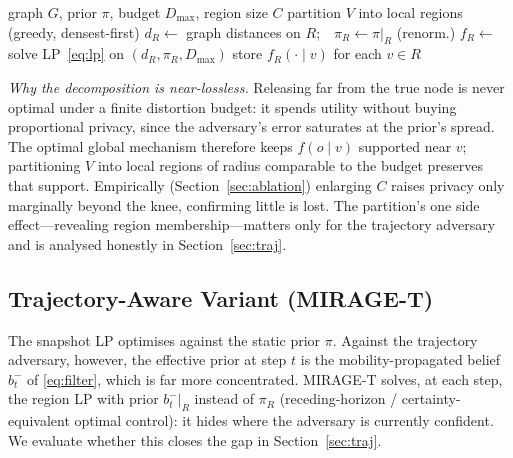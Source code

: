 \documentclass[10pt,journal,compsoc]{IEEEtran}
\begin{document}
\begin{algorithm}[t]
\caption{MIRAGE precompute (per graph, offline)}
\label{alg:mirage}
\begin{algorithmic}[1]
\REQUIRE graph $G$, prior $\pi$, budget $D_{\max}$, region size $C$
\STATE partition $V$ into local regions (greedy, densest-first)
  \STATE $d_R\leftarrow$ graph distances on $R$;\ \ $\pi_R\leftarrow\pi|_R$ (renorm.)
  \STATE $f_R\leftarrow$ solve LP~\eqref{eq:lp} on $(d_R,\pi_R,D_{\max})$
  \STATE store $f_R(\cdot\mid v)$ for each $v\in R$
\ENDFOR
\end{algorithmic}
\end{algorithm}

\emph{Why the decomposition is near-lossless.} Releasing far from the true node is
never optimal under a finite distortion budget: it spends utility without buying
proportional privacy, since the adversary's error saturates at the prior's spread.
The optimal global mechanism therefore keeps $f(o\mid v)$ supported near $v$;
partitioning $V$ into local regions of radius comparable to the budget preserves
that support. Empirically (Section~\ref{sec:ablation}) enlarging $C$ raises privacy
only marginally beyond the knee, confirming little is lost. The partition's one
side effect---revealing region membership---matters only for the trajectory
adversary and is analysed honestly in Section~\ref{sec:traj}.

\subsection{Trajectory-Aware Variant (MIRAGE-T)}
The snapshot LP optimises against the static prior $\pi$. Against the trajectory
adversary, however, the effective prior at step $t$ is the mobility-propagated
belief $b_t^-$ of \eqref{eq:filter}, which is far more concentrated. MIRAGE-T
solves, at each step, the region LP with prior $b_t^-|_R$ instead of $\pi_R$
(receding-horizon / certainty-equivalent optimal control): it hides where the
adversary is currently confident. We evaluate whether this closes the gap in
Section~\ref{sec:traj}.

\end{document}
